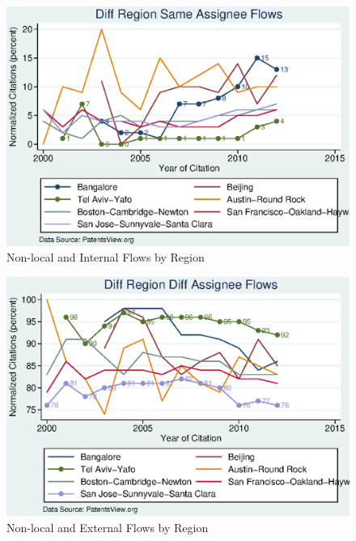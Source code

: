 \documentclass[12pt]{article}
\begin{document}
\begin{figure}[h]
\begin{centering}
  \includegraphics[width=\textwidth]{DiffRegionSameAssigneeFlows}
  \caption{Non-local and Internal Flows by Region}
  \label{fig:DiffRegionSameAssigneeFlows}
\end{centering}
\end{figure}

\begin{figure}[h]
\begin{centering}
  \includegraphics[width=\textwidth]{DiffRegionDiffAssigneeFlows}
  \caption{Non-local and External Flows by Region}
  \label{fig:DiffRegionDiffAssigneeFlows}
\end{centering}
\end{figure}

\newpage
\appendix
\end{document}
